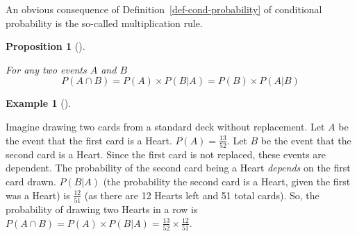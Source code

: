 \documentclass[
  letterpaper,
]{scrbook}
\theoremstyle{definition}
\theoremstyle{plain}
\newtheorem{proposition}{Proposition}[chapter]
\theoremstyle{plain}
\theoremstyle{definition}
\newtheorem{example}{Example}[chapter]
\theoremstyle{remark}
\begin{document}
An obvious consequence of Definition~\ref{def-cond-probability} of
conditional probability is the so-called multiplication rule.

\begin{tcolorbox}[enhanced jigsaw, bottomtitle=1mm, coltitle=black, toprule=.15mm, toptitle=1mm, bottomrule=.15mm, colback=white, arc=.35mm, opacityback=0, breakable, title={Multiplication Rule}, titlerule=0mm, rightrule=.15mm, colbacktitle=quarto-callout-note-color!10!white, colframe=quarto-callout-note-color-frame, opacitybacktitle=0.6, leftrule=.75mm, left=2mm]

\begin{proposition}[]\protect\hypertarget{prp-multiplication-rule}{}\label{prp-multiplication-rule}

For any two events \(A\) and \(B\)
\[ P(A \cap B) = P(A) \times P(B|A) = P(B) \times P(A|B) \]

\end{proposition}

\end{tcolorbox}

\begin{tcolorbox}[enhanced jigsaw, bottomtitle=1mm, coltitle=black, toprule=.15mm, toptitle=1mm, bottomrule=.15mm, colback=white, arc=.35mm, opacityback=0, breakable, title={Drawing Cards without Replacement}, titlerule=0mm, rightrule=.15mm, colbacktitle=quarto-callout-note-color!10!white, colframe=quarto-callout-note-color-frame, opacitybacktitle=0.6, leftrule=.75mm, left=2mm]

\begin{example}[]\protect\hypertarget{exm-drawing-cards-dependence}{}\label{exm-drawing-cards-dependence}

Imagine drawing two cards from a standard deck without replacement. Let
\(A\) be the event that the first card is a Heart.
\(P(A) = \frac{13}{52}\). Let \(B\) be the event that the second card is
a Heart. Since the first card is not replaced, these events are
dependent. The probability of the second card being a Heart
\emph{depends} on the first card drawn. \(P(B|A)\) (the probability the
second card is a Heart, given the first was a Heart) is
\(\frac{12}{51}\) (as there are 12 Hearts left and 51 total cards). So,
the probability of drawing two Hearts in a row is
\(P(A \cap B) = P(A) \times P(B|A) = \frac{13}{52} \times \frac{12}{51}\).

\end{example}

\end{tcolorbox}
\end{document}
